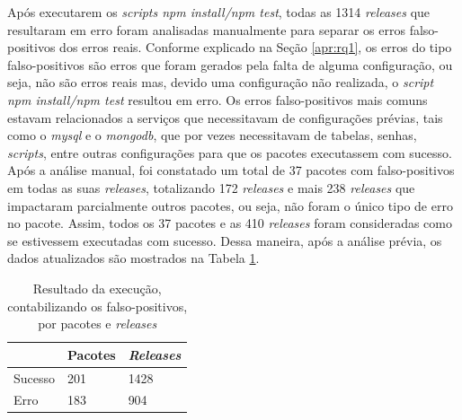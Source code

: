 Após executarem os \textit{scripts npm install/npm test}, todas as 1314 \textit{releases} que resultaram em erro foram analisadas manualmente para separar os erros falso-positivos dos erros reais. Conforme explicado na Seção \ref{apr:rq1}, os erros do tipo falso-positivos são erros que foram gerados pela falta de alguma configuração, ou seja, não são erros reais mas, devido uma configuração não realizada, o \textit{script npm install/npm test} resultou em erro. Os erros falso-positivos mais comuns estavam relacionados a serviços que necessitavam de configurações prévias, tais como o \textit{mysql} e o \textit{mongodb}, que por vezes necessitavam de tabelas, senhas, \textit{scripts}, entre outras configurações para que os pacotes executassem com sucesso. Após a análise manual, foi constatado um total de 37 pacotes com falso-positivos em todas as suas \textit{releases}, totalizando 172 \textit{releases} e mais 238 \textit{releases} que impactaram parcialmente outros pacotes, ou seja, não foram o único tipo de erro no pacote. Assim, todos os 37 pacotes e as 410 \textit{releases} foram consideradas como se estivessem executadas com sucesso. Dessa maneira, após a análise prévia, os dados atualizados são mostrados na Tabela \ref{tab:res_rq1_2}.

\begin{table}[]
\centering
\begin{tabular}{|l|l|l|}
\hline
                    & Pacotes & \textit{Releases} \\ \hline
    Sucesso         & 201     & 1428     \\
    Erro            & 183     & 904     \\ \hline
\end{tabular}
\caption{Resultado da execução, contabilizando os falso-positivos, por pacotes e \textit{releases}}
\label{tab:res_rq1_2}
\end{table}


